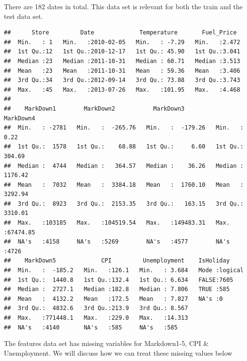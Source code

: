 \documentclass[]{article}
\newenvironment{Shaded}{\begin{snugshade}}{\end{snugshade}}
\newcommand{\KeywordTok}[1]{\textcolor[rgb]{0.13,0.29,0.53}{\textbf{{#1}}}}
\newcommand{\StringTok}[1]{\textcolor[rgb]{0.31,0.60,0.02}{{#1}}}
\newcommand{\NormalTok}[1]{{#1}}
\begin{document}
There are 182 dates in total. This data set is relevant for both the
train and the test data set.

\begin{Shaded}
\end{Shaded}

\begin{verbatim}
##      Store         Date             Temperature       Fuel_Price   
##  Min.   : 1   Min.   :2010-02-05   Min.   : -7.29   Min.   :2.472  
##  1st Qu.:12   1st Qu.:2010-12-17   1st Qu.: 45.90   1st Qu.:3.041  
##  Median :23   Median :2011-10-31   Median : 60.71   Median :3.513  
##  Mean   :23   Mean   :2011-10-31   Mean   : 59.36   Mean   :3.406  
##  3rd Qu.:34   3rd Qu.:2012-09-14   3rd Qu.: 73.88   3rd Qu.:3.743  
##  Max.   :45   Max.   :2013-07-26   Max.   :101.95   Max.   :4.468  
##                                                                    
##    MarkDown1        MarkDown2           MarkDown3           MarkDown4       
##  Min.   : -2781   Min.   :  -265.76   Min.   :  -179.26   Min.   :    0.22  
##  1st Qu.:  1578   1st Qu.:    68.88   1st Qu.:     6.60   1st Qu.:  304.69  
##  Median :  4744   Median :   364.57   Median :    36.26   Median : 1176.42  
##  Mean   :  7032   Mean   :  3384.18   Mean   :  1760.10   Mean   : 3292.94  
##  3rd Qu.:  8923   3rd Qu.:  2153.35   3rd Qu.:   163.15   3rd Qu.: 3310.01  
##  Max.   :103185   Max.   :104519.54   Max.   :149483.31   Max.   :67474.85  
##  NA's   :4158     NA's   :5269        NA's   :4577        NA's   :4726      
##    MarkDown5             CPI         Unemployment    IsHoliday      
##  Min.   :  -185.2   Min.   :126.1   Min.   : 3.684   Mode :logical  
##  1st Qu.:  1440.8   1st Qu.:132.4   1st Qu.: 6.634   FALSE:7605     
##  Median :  2727.1   Median :182.8   Median : 7.806   TRUE :585      
##  Mean   :  4132.2   Mean   :172.5   Mean   : 7.827   NA's :0        
##  3rd Qu.:  4832.6   3rd Qu.:213.9   3rd Qu.: 8.567                  
##  Max.   :771448.1   Max.   :229.0   Max.   :14.313                  
##  NA's   :4140       NA's   :585     NA's   :585
\end{verbatim}

The features data set has missing variables for Markdown1-5, CPI \&
Unemployment. We will discuss how we can treat these missing values
below
\end{document}
